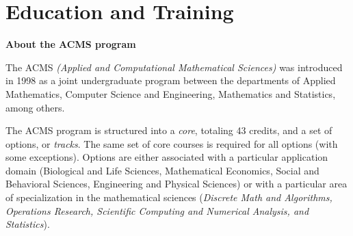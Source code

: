 \section{Education and Training}
\label{sec:education}


{\bf About the ACMS program}

The ACMS {\em (Applied and Computational Mathematical Sciences)} was
introduced in 1998 as a joint undergraduate program between the
departments of Applied Mathematics, Computer Science and Engineering,
Mathematics and Statistics, among others.

The ACMS program is structured into a {\em core}, totaling 43 credits,
and a set of options, or {\em tracks}. The same set of core courses is
required for all options (with some exceptions). Options are either
associated with a particular application domain (Biological and Life
Sciences, Mathematical Economics, Social and Behavioral Sciences,
Engineering and Physical Sciences) or with a particular area of
specialization in the mathematical sciences ({\em Discrete Math and
  Algorithms, Operations Research, Scientific Computing and Numerical
  Analysis, and Statistics}). 

